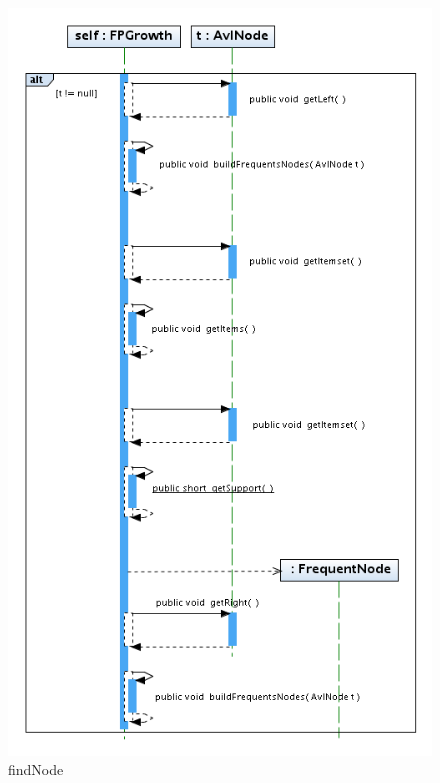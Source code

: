 \begin{figure}
\centering
\includegraphics[width=1\textwidth]{FPGrowth/buildFrequentsNodes.png}
\caption{findNode}
\end{figure}
\newpage
